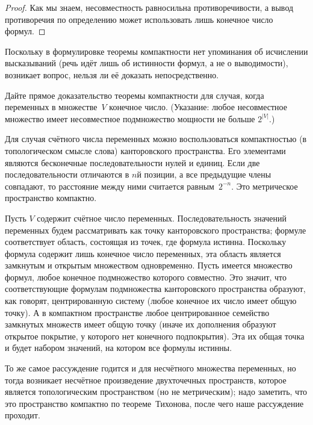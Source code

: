 \begin{proof}
Как мы знаем, несовместность равносильна противоречивости, а
вывод противоречия по определению может использовать лишь
конечное число формул.
\end{proof}

Поскольку в формулировке теоремы компактности нет упоминания об
исчислении высказываний (речь идёт лишь об истинности формул, а
не о выводимости), возникает вопрос, нельзя ли её доказать
непосредственно.

\begin{problem}
Дайте прямое доказательство теоремы компактности для случая,
когда переменных в множестве~$V$ конечное число. (Указание: любое несовместное множество имеет несовместное
подмножество мощности не больше $2^{|V|}$.)
\end{problem}

Для случая счётного числа переменных можно воспользоваться
компактностью (в топологическом смысле слова) канторовского
пространства.%
Его элементами являются бесконечные
последовательности нулей и единиц. Если две последовательности
отличаются в $n$\д й позиции, а все предыдущие члены совпадают,
то расстояние между ними считается равным~$2^{-n}$. Это
метрическое пространство компактно.

Пусть $V$ содержит счётное число переменных. Последовательность
значений переменных будем рассматривать как точку канторовского
пространства; формуле соответствует область, состоящая из точек,
где формула истинна. Поскольку формула содержит лишь конечное
число переменных, эта область является замкнутым и открытым
множеством одновременно. Пусть имеется множество формул, любое
конечное подмножество которого совместно. Это значит, что
соответствующие формулам подмножества канторовского пространства
образуют, как говорят, центрированную систему%
(любое конечное их
число имеет общую точку). А в компактном пространстве любое
центрированное семейство замкнутых множеств имеет общую точку
(иначе их дополнения образуют открытое покрытие, у которого нет
конечного подпокрытия). Эта их общая точка и будет набором
значений, на котором все формулы истинны.

То же самое рассуждение годится и для несчётного множества
переменных, но тогда возникает несчётное произведение
двухточечных пространств, которое является топологическим
пространством (но не метрическим); надо заметить, что это
пространство компактно по теореме~Тихонова,%
%
после чего наше рассуждение проходит.

